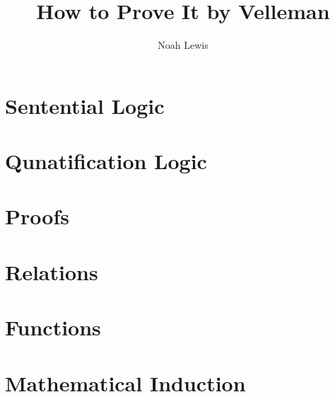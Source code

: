 \documentclass[10pt]{article}  %
\title{How to Prove It by Velleman}
\author{Noah Lewis}
\begin{document}
\maketitle

\tableofcontents

\section{Sentential Logic}

\section{Qunatification Logic}

\section{Proofs}

\section{Relations}

\section{Functions}

\section{Mathematical Induction}

\end{document}

